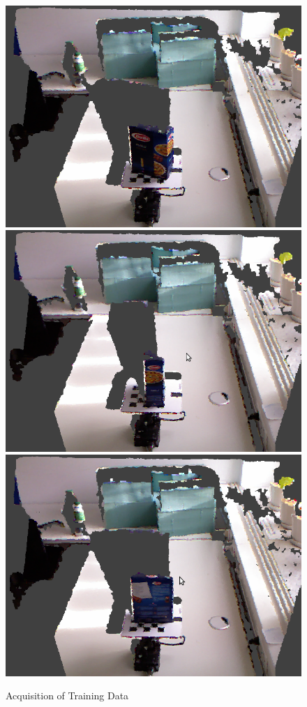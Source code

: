 \documentclass[conference]{sty/IEEEtran}
\begin{document}
\begin{figure}[htb!]
  \begin{center}
    \includegraphics[width=.45\columnwidth]{figures/rot_table/barilla.png}
\hfill
    \includegraphics[width=.45\columnwidth]{figures/rot_table/barilla1.png} \\
    \includegraphics[width=.45\columnwidth]{figures/rot_table/barilla2.png}
\caption{Acquisition of Training Data}
    \label{fig:data_acquisition}
  \end{center}
\end{figure}
\end{document}
